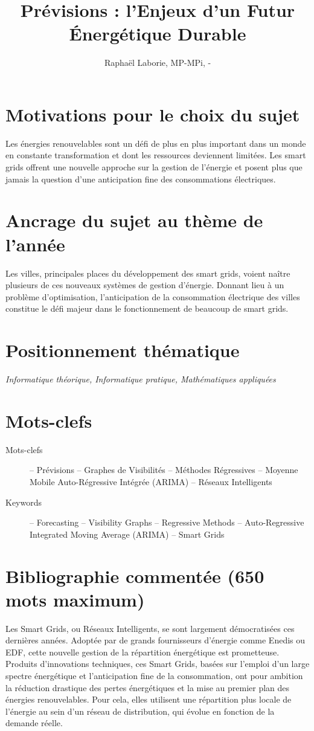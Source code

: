 \documentclass[12pt,a4paper]{article}
\title{Prévisions : l'Enjeux d'un Futur Énergétique Durable}
\author{Raphaël Laborie, MP\oldstylenums{1}-MPi, \oldstylenums{\the\year}-\oldstylenums{\arabic{nextyear}} }
\newcommand{\positionnementThematique}[1]{
\section*{Positionnement thématique}
{\it #1}}
\newcommand{\motclefs}[2]{
    \section*{Mots-clefs}
        \begin{description}
            \item[Mots-clefs] -- #1 
            \item[Keywords]   -- #2
        \end{description}
}
\begin{document}
\maketitle
\section*{Motivations pour le choix du sujet}
Les énergies renouvelables sont un défi de plus en plus important dans un monde en constante transformation et dont les ressources deviennent limitées.
Les smart grids offrent une nouvelle approche sur la gestion de l'énergie et posent plus que jamais la question d'une anticipation fine des consommations électriques.
\section*{Ancrage du sujet au thème de l'année}
Les villes, principales places du développement des smart grids, voient naître plusieurs de ces nouveaux systèmes de gestion d'énergie. Donnant lieu à un problème d'optimisation, l'anticipation de la consommation électrique des villes constitue le défi majeur dans le fonctionnement de beaucoup de smart grids.
\positionnementThematique{Informatique théorique, Informatique pratique, Mathématiques appliquées}
\motclefs{Prévisions -- Graphes de Visibilités -- Méthodes Régressives -- Moyenne Mobile Auto-Régressive Intégrée (ARIMA) -- Réseaux Intelligents}{Forecasting -- Visibility Graphs -- Regressive Methods -- Auto-Regressive Integrated Moving Average (ARIMA) -- Smart Grids}
\section*{Bibliographie commentée (650 mots maximum)}

Les Smart Grids, ou Réseaux Intelligents, se sont largement démocratisées ces dernières années. Adoptée par de grands fournisseurs d'énergie comme Enedis ou EDF, cette nouvelle gestion de la répartition énergétique est prometteuse. Produits d'innovations techniques, ces Smart Grids, basées sur l'emploi d'un large spectre énergétique et l'anticipation fine de la consommation, ont pour ambition la réduction drastique des pertes énergétiques et la mise au premier plan des énergies renouvelables. Pour cela, elles utilisent une répartition plus locale de l'énergie au sein d'un réseau de distribution, qui évolue en fonction de la demande réelle.
\end{document}
